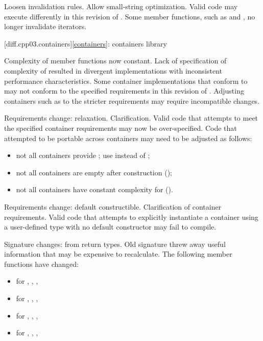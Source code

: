\change
Loosen  invalidation rules.
\rationale
Allow small-string optimization.
\effect
Valid \CppIII{} code may execute differently in this revision of \Cpp{}.
Some  member functions, such as  and ,
no longer invalidate iterators.

[diff.cpp03.containers]{\ref{containers}: containers library}

\change
Complexity of  member functions now constant.
\rationale
Lack of specification of complexity of  resulted in
divergent implementations with inconsistent performance characteristics.
\effect
Some container implementations that conform to \CppIII{} may not conform to the
specified  requirements in this revision of \Cpp{}. Adjusting
containers such as  to the stricter requirements may require
incompatible changes.

\change
Requirements change: relaxation.
\rationale
Clarification.
\effect
Valid \CppIII{} code that attempts to meet the specified container requirements
may now be over-specified. Code that attempted to be portable across containers
may need to be adjusted as follows:
\begin{itemize}
\item not all containers provide ; use  instead
of ;
\item not all containers are empty after construction ();
\item not all containers have constant complexity for  ().
\end{itemize}

\change
Requirements change: default constructible.
\rationale
Clarification of container requirements.
\effect
Valid \CppIII{} code that attempts to explicitly instantiate a container using
a user-defined type with no default constructor may fail to compile.

\change
Signature changes: from  return types.
\rationale
Old signature threw away useful information that may be expensive
to recalculate.
\effect
The following member functions have changed:
\begin{itemize}
\item {} for , , , 
\item {} for , , , 
\item {} for , , , 
\item {} for , , , 
\end{itemize}

